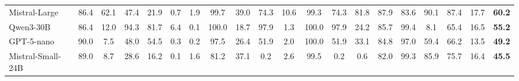\begin{table}[t]
\begin{tabular}{lccccccccccccccccccc}
Mistral-Large & 86.4 & 62.1 & 47.4 & 21.9 & 0.7 & 1.9 & 99.7 & 39.0 & 74.3 & 10.6 & 99.3 & 74.3 & 81.8 & 87.9 & 83.6 & 90.1 & 87.4 & 17.7 & \textbf{60.2} \\
Qwen3-30B & 86.4 & 12.0 & 94.3 & 81.7 & 6.4 & 0.1 & 100.0 & 18.7 & 97.9 & 1.3 & 100.0 & 97.9 & 24.2 & 85.7 & 99.4 & 8.1 & 65.4 & 16.5 & \textbf{55.2} \\
GPT-5-nano & 90.0 & 7.5 & 48.0 & 54.5 & 0.3 & 0.2 & 97.5 & 26.4 & 51.9 & 2.0 & 100.0 & 51.9 & 33.1 & 84.8 & 97.0 & 59.4 & 66.2 & 13.5 & \textbf{49.2} \\
Mistral-Small-24B & 89.0 & 8.7 & 28.6 & 16.2 & 0.1 & 1.6 & 81.2 & 37.1 & 0.2 & 2.6 & 99.5 & 0.2 & 0.6 & 82.0 & 99.3 & 85.9 & 75.7 & 16.4 & \textbf{45.5} \\
\bottomrule
\end{tabular}
\end{table}